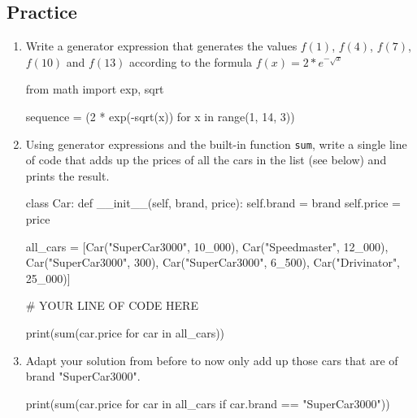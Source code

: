\subsection{Practice}

\begin{enumerate}
    \item Write a generator expression that generates the values $f(1)$, $f(4)$, $f(7)$, $f(10)$ and $f(13)$ according to the formula $f(x) = 2 * e^{-\sqrt x}$

    \vspace{1em}
    \begin{solution}
        \begin{pythoncode}
from math import exp, sqrt

sequence = (2 * exp(-sqrt(x)) for x in range(1, 14, 3))
        \end{pythoncode}
    \end{solution}

    \item Using generator expressions and the built-in function {\tt sum}, write a single line of code that adds up the prices of all the cars in the list (see below) and prints the result.

    \begin{pythoncode}
class Car:
    def __init__(self, brand, price):
        self.brand = brand
        self.price = price

all_cars = [Car("SuperCar3000", 10_000), Car("Speedmaster", 12_000),
            Car("SuperCar3000", 300), Car("SuperCar3000", 6_500),
            Car("Drivinator", 25_000)]

# YOUR LINE OF CODE HERE
    \end{pythoncode}

    \begin{solution}
        \begin{pythoncode}
print(sum(car.price for car in all_cars))
        \end{pythoncode}
    \end{solution}

    \item Adapt your solution from before to now only add up those cars that are of brand "SuperCar3000".

    \vspace{1em}
    \begin{solution}
        \begin{pythoncode}
print(sum(car.price for car in all_cars if car.brand == "SuperCar3000"))
        \end{pythoncode}
    \end{solution}


\end{enumerate}
